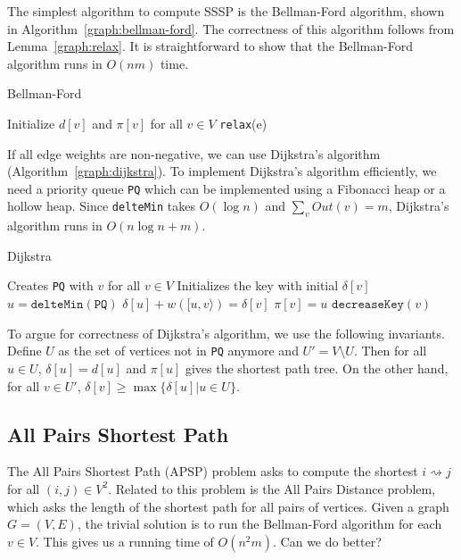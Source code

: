 The simplest algorithm to compute SSSP is the Bellman-Ford algorithm, shown in
Algorithm~\ref{graph:bellman-ford}.  The correctness of this algorithm follows
from Lemma~\ref{graph:relax}.  It is straightforward to show that the
Bellman-Ford algorithm runs in $O(nm)$ time.
\begin{algorithm}
  \caption{Bellman-Ford}\label{graph:bellman-ford}
  \begin{algorithmic}
      \State Initialize $d[v]$ and $\pi[v]$ for all $v\in V$
        \State \texttt{relax}(e)
        \EndFor
      \EndFor
    \EndFunction
  \end{algorithmic}
\end{algorithm}

If all edge weights are non-negative, we can use Dijkstra's algorithm
(Algorithm~\ref{graph:dijkstra}).  To implement Dijkstra's algorithm
efficiently, we need a priority queue \texttt{PQ} which can be implemented
using a Fibonacci heap or a hollow heap.  Since \texttt{delteMin} takes $O(\log
n)$ and $\sum_v Out(v)=m$, Dijkstra's algorithm runs in $O(n\log n+m)$.
\begin{algorithm}
  \caption{Dijkstra}\label{graph:dijkstra}
  \begin{algorithmic}
    \State Creates \texttt{PQ} with $v$ for all $v\in V$
    \State Initializes the key with initial $\delta[v]$
        \State $u=\texttt{delteMin}(\texttt{PQ})$
          \If{$\delta[u]+w([u,v\rangle)<\delta[v]$}
            \State $\delta[u]+w([u,v\rangle)=\delta[v]$
            \State $\pi[v]=u$
            \State $\texttt{decreaseKey}(v)$
          \EndIf
        \EndFor
      \EndWhile
    \EndFunction
  \end{algorithmic}
\end{algorithm}

To argue for correctness of Dijkstra's algorithm, we use the following
invariants.  Define $U$ as the set of vertices not in \texttt{PQ} anymore and
$U'=V\setminus U$.  Then for all $u\in U$, $\delta[u]=d[u]$ and $\pi[u]$ gives
the shortest path tree.  On the other hand, for all $v\in U'$,
$\delta[v]\geq\max\{\delta[u]|u\in U\}$.


\subsection{All Pairs Shortest Path}
The All Pairs Shortest Path (APSP) problem asks to compute the shortest
$i\rightsquigarrow j$ for all $(i,j)\in V^2$.  Related to this problem is the
All Pairs Distance problem, which asks the length of the shortest path for all
pairs of vertices.  Given a graph $G=(V,E)$, the trivial solution is to run the
Bellman-Ford algorithm for each $v\in V$.  This gives us a running time of
$O(n^2m)$.  Can we do better?

